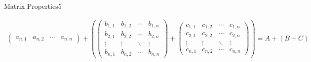 \begin{questions}
\begin{question}{Matrix Properties}{5}
\begin{answer}
\begin{itemize}
\begin{align*}
\begin{pmatrix}
a_{n, 1} & a_{n, 2} & \cdots & a_{n, n}
\end{pmatrix} + (\begin{pmatrix}
b_{1, 1} & b_{1, 2} & \cdots & b_{1, n}\\
b_{2, 1} & b_{2, 2} & \cdots & b_{2, n}\\
\vdots & \vdots & \ddots & \vdots\\
b_{n, 1} & b_{n, 2} & \cdots & b_{n, n}
\end{pmatrix} + \begin{pmatrix}
c_{1, 1} & c_{1, 2} & \cdots & c_{1, n}\\
c_{2, 1} & c_{2, 2} & \cdots & c_{2, n}\\
\vdots & \vdots & \ddots & \vdots\\
c_{n, 1} & c_{n, 2} & \cdots & c_{n, n}
\end{pmatrix}) = A + (B + C)
		\end{align*}	
	\end{itemize}
	

\end{answer}
\end{question}
\end{questions}
